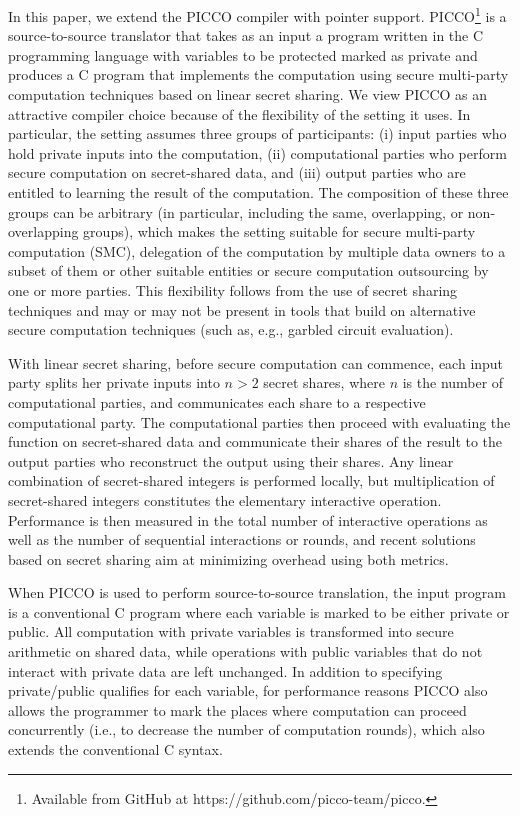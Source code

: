 \documentclass[11pt]{article}
\begin{document}
In this paper, we extend the PICCO compiler \cite{zha13} with pointer
support. PICCO\footnote{Available from GitHub at
https://github.com/picco-team/picco.} is a source-to-source translator that
takes as an input a program written in the C programming language with
variables to be protected marked as private and produces a C program that
implements the computation using secure multi-party computation techniques
based on linear secret sharing. We view PICCO as an attractive compiler
choice because of the flexibility of the setting it uses. In particular, the
setting assumes three groups of participants: (i) input parties who hold
private inputs into the computation, (ii) computational parties who perform
secure computation on secret-shared data, and (iii) output parties who are
entitled to learning the result of the computation. The composition of these
three groups can be arbitrary (in particular, including the same,
overlapping, or non-overlapping groups), which makes the setting suitable
for secure multi-party computation (SMC), delegation of the computation by
multiple data owners to a subset of them or other suitable entities or
secure computation outsourcing by one or more parties. This flexibility
follows from the use of secret sharing techniques and may or may not be
present in tools that build on alternative secure computation techniques
(such as, e.g., garbled circuit evaluation).

With linear secret sharing, before secure computation can commence, each
input party splits her private inputs into $n > 2$ secret shares, where $n$
is the number of computational parties, and communicates each share to a
respective computational party. The computational parties then proceed with
evaluating the function on secret-shared data and communicate their shares
of the result to the output parties who reconstruct the output using their
shares. Any linear combination of secret-shared integers is performed
locally, but multiplication of secret-shared integers constitutes the
elementary interactive operation. Performance is then measured in the total
number of interactive operations as well as the number of sequential
interactions or rounds, and recent solutions based on secret sharing aim at
minimizing overhead using both metrics.

When PICCO is used to perform source-to-source translation, the input
program is a conventional C program where each variable is marked to be
either private or public. All computation with private variables is
transformed into secure arithmetic on shared data, while operations with
public variables that do not interact with private data are left unchanged.
In addition to specifying private/public qualifies for each variable, for
performance reasons PICCO also allows the programmer to mark the places
where computation can proceed concurrently (i.e., to decrease the number of
computation rounds), which also extends the conventional C syntax. 
\end{document}
